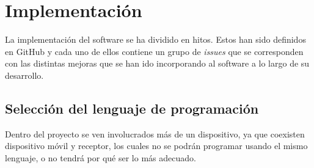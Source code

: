 \chapter{Implementación}

La implementación del software se ha dividido en hitos. Estos han sido definidos en GitHub
y cada uno de ellos contiene un grupo de \textit{issues} que se corresponden con las distintas
mejoras que se han ido incorporando al software a lo largo de su desarrollo.\\

\section{Selección del lenguaje de programación}

Dentro del proyecto se ven involucrados más de un dispositivo, ya que coexisten
dispositivo móvil y receptor, los cuales no se podrán programar usando el mismo
lenguaje, o no tendrá por qué ser lo más adecuado.
